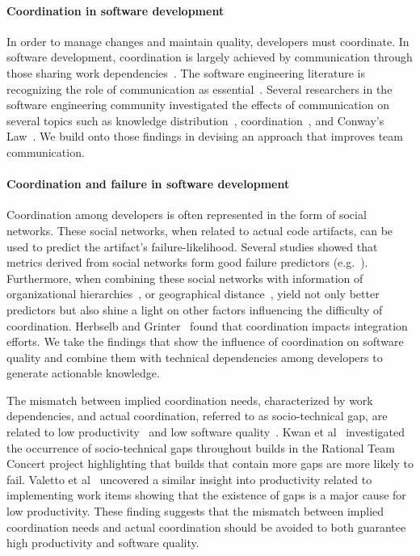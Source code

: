 \documentclass[conference]{IEEEtran}
\begin{document}
\paragraph{Coordination in software development}
In order to manage changes and maintain quality, developers must coordinate. In
software development, coordination is largely achieved by communication through those sharing work dependencies~\cite{kraut1995:coordination}. 
The software engineering literature is recognizing the role of communication as essential~\cite{nakakoji2010:rdc}.
Several researchers in the software engineering community investigated the effects of communication on several topics such as knowledge distribution~\cite{ehrlich:icgse:2006}, coordination~\cite{hinds:cscw:2006}, and Conway's Law~\cite{cataldo:cscw:2006}.
We build onto those findings in devising an approach that improves team communication.


\paragraph{Coordination and failure in software development}
Coordination among developers is often represented in the form of social networks.
These social networks, when related to actual code artifacts, can be used to predict the artifact's failure-likelihood.
Several studies showed that metrics derived from social networks form good failure predictors (e.g.~\cite{meneely:fse:2008}).
Furthermore, when combining these social networks with information of organizational hierarchies~\cite{nagappan:icse:2008}, or geographical distance~\cite{bird:acm:2009}, yield not only better predictors but also shine a light on other factors influencing the difficulty of coordination.
Herbselb and Grinter~\cite{herbsleb:icse:1999} found that coordination impacts integration efforts.
We take the findings that show the influence of coordination on software quality and combine them with technical dependencies among developers to generate actionable knowledge.

The mismatch between implied coordination needs, characterized by work dependencies, and actual coordination, referred to as socio-technical gap, are related to low productivity~\cite{valetto:msr:2007} and low software quality~\cite{kwan:tse:2011}.
Kwan et al~\cite{kwan:tse:2011} investigated the occurrence of socio-technical gaps throughout builds in the Rational Team Concert project highlighting that builds that contain more gaps are more likely to fail.
Valetto et al~\cite{valetto:msr:2007} uncovered a similar insight into productivity related to implementing work items showing that the existence of gaps is a major cause for low productivity.
These finding suggests that the mismatch between implied coordination needs and actual coordination should be avoided to both guarantee high productivity and software quality.
  
\end{document}

